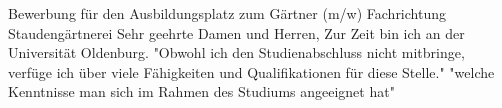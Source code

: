 \documentclass[12pt,a4paper]{moderncv}
\begin{document}
\Large{Bewerbung für den Ausbildungsplatz zum Gärtner (m/w) Fachrichtung Staudengärtnerei}
Sehr geehrte Damen und Herren,
Zur Zeit bin ich an der Universität Oldenburg. 
"Obwohl ich den Studienabschluss nicht mitbringe,
verfüge ich über viele Fähigkeiten und Qualifikationen für diese Stelle."
 "welche Kenntnisse man sich im Rahmen des Studiums angeeignet hat"
\end{document}
